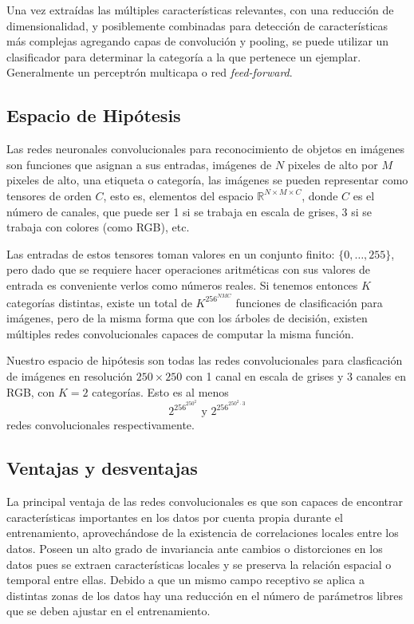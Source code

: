 \documentclass[spanish,11pt,letterpaper]{article}
\begin{document}
Una vez extraídas las múltiples características relevantes, con una reducción
de dimensionalidad, y posiblemente combinadas para detección de características
más complejas agregando capas de convolución y pooling, se puede utilizar un
clasificador para determinar la categoría a la que pertenece un ejemplar.
Generalmente un perceptrón multicapa o red \textit{feed-forward}.

\subsection{Espacio de Hipótesis}

Las redes neuronales convolucionales para reconocimiento de objetos en imágenes
son funciones que asignan a sus entradas, imágenes de $N$ pixeles de alto por $M$
pixeles de alto, una etiqueta o categoría, las imágenes se pueden representar
como tensores de orden $C$, esto es, elementos del espacio
$\mathbb{R}^{N\times M\times C}$, donde $C$ es el número de canales, que puede ser
1 si se trabaja en escala de grises, 3 si se trabaja con colores (como RGB), etc.

Las entradas de estos tensores toman valores en un conjunto finito: $\{0,\ldots,255\}$,
pero dado que se requiere hacer operaciones aritméticas con sus valores de entrada
es conveniente verlos como números reales. Si tenemos entonces $K$ categorías
distintas, existe un total de $K^{256^{NMC}}$ funciones de clasificación para
imágenes, pero de la misma forma que con los árboles de decisión, existen múltiples
redes convolucionales capaces de computar la misma función.

Nuestro espacio de hipótesis son todas las redes convolucionales para clasficación
de imágenes en resolución $250 \times 250$ con 1 canal en escala de grises y 3
canales en RGB, con $K = 2$ categorías. Esto es al menos
\[ 2^{256^{250^2}} \text{  y  } 2^{256^{250^2 \cdot 3}}\]
redes convolucionales respectivamente.

\subsection{Ventajas y desventajas}

La principal ventaja de las redes convolucionales es que son capaces de encontrar
características importantes en los datos por cuenta propia durante el entrenamiento,
aprovechándose de la existencia de correlaciones locales entre los datos. Poseen
un alto grado de invariancia ante cambios o distorciones en los datos pues
se extraen características locales y se preserva la relación espacial o temporal
entre ellas. Debido a que un mismo campo receptivo se aplica a distintas zonas de
los datos hay una reducción en el número de parámetros libres que se
deben ajustar en el entrenamiento\cite{haykin}.
\end{document}
